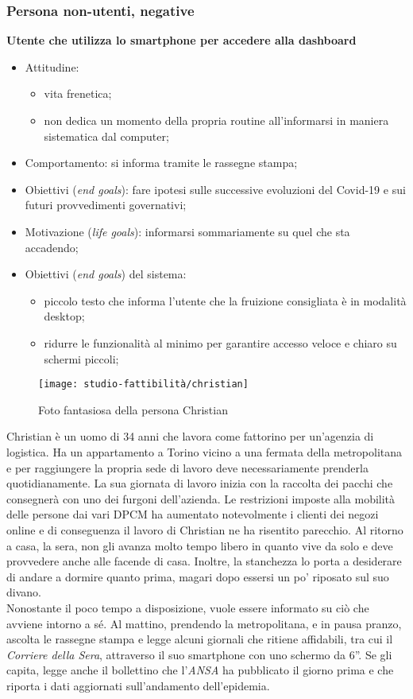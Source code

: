 \subsubsection*{Persona non-utenti, negative}
\textbf{Utente che utilizza lo smartphone per accedere alla dashboard}
\begin{itemize}
	\item Attitudine:
    \begin{itemize}
        \item vita frenetica;
        \item non dedica un momento della propria routine all'informarsi in maniera sistematica dal computer;
    \end{itemize}
    \item Comportamento: si informa tramite le rassegne stampa;
    \item Obiettivi (\textit{end goals}): fare ipotesi sulle successive evoluzioni del Covid-19 e sui futuri provvedimenti governativi;
    \item Motivazione (\textit{life goals}): informarsi sommariamente su quel che sta accadendo;
    \item Obiettivi (\textit{end goals}) del sistema:
    \begin{itemize}
        \item piccolo testo che informa l'utente che la fruizione consigliata è in modalità desktop;
        \item ridurre le funzionalità al minimo per garantire accesso veloce e chiaro su schermi piccoli;
    \end{itemize}
\end{itemize}

\begin{wrapfigure}{l}{7cm}
    \texttt{[image: studio-fattibilità/christian]}
    \caption{Foto fantasiosa della persona Christian}
\end{wrapfigure}

Christian è un uomo di 34 anni che lavora come fattorino per un'agenzia di logistica. Ha un appartamento a Torino vicino a una fermata della metropolitana e per raggiungere la propria sede di lavoro deve necessariamente prenderla quotidianamente. La sua giornata di lavoro inizia con la raccolta dei pacchi che consegnerà con uno dei furgoni dell'azienda. Le restrizioni imposte alla mobilità delle persone dai vari DPCM ha aumentato notevolmente i clienti dei negozi online e di conseguenza il lavoro di Christian ne ha risentito parecchio. Al ritorno a casa, la sera, non gli avanza molto tempo libero in quanto vive da solo e deve provvedere anche alle facende di casa. Inoltre, la stanchezza lo porta a desiderare di andare a dormire quanto prima, magari dopo essersi un po' riposato sul suo divano.\\
Nonostante il poco tempo a disposizione, vuole essere informato su ciò che avviene intorno a sé. Al mattino, prendendo la metropolitana, e in pausa pranzo, ascolta le rassegne stampa e legge alcuni giornali che ritiene affidabili, tra cui il \textit{Corriere della Sera}, attraverso il suo smartphone con uno schermo da 6''. Se gli capita, legge anche il bollettino che l'\textit{ANSA} ha pubblicato il giorno prima e che riporta i dati aggiornati sull'andamento dell'epidemia.


